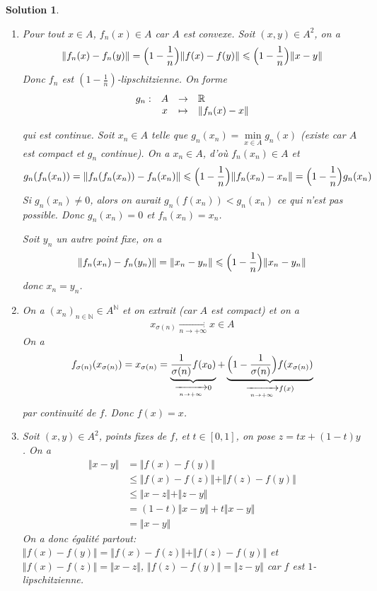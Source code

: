 \documentclass[12pt]{article}
\newtheorem{solution}{Solution}[section]
\theoremstyle{remark}
\newcommand{\N}{\mathbb{N}} \newcommand{\Z}{\mathbb{Z}}
\newcommand{\function}[5]{
	$$
	\begin{array}{rccl}
		#1: & #2 & \to & #3 \\
		& #4 & \mapsto & #5
	\end{array}
	$$
}
\begin{document}
\begin{solution}
	\phantom{}
	\begin{enumerate}
		\item Pour tout $x\in A$, $f_{n}(x)\in A$ car $A$ est convexe. Soit $(x,y)\in A^{2}$, on a
		$$\Vert f_{n}(x)-f_{n}(y)\Vert=\Bigl(1-\frac{1}{n}\Bigr)\Vert f(x)-f(y)\Vert\leqslant\Bigl(1-\frac{1}{n}\Bigr)\Vert x-y\Vert$$
		Donc $f_{n}$ est $(1-\frac{1}{n})$-lipschitzienne. On forme \function{g_n}{A}{\R}{x}{\Vert f_n(x)-x\Vert}
		qui est continue. Soit $x_{n}\in A$ telle que $g_{n}(x_{n})=\min\limits_{x\in A}g_{n}(x)$ (existe car $A$ est compact et $g_{n}$ continue). On a $x_{n}\in A$, d'où $f_{n}(x_{n})\in A$ et 
		$$g_{n}(f_{n}(x_{n}))=\Vert f_{n}(f_{n}(x_{n}))-f_{n}(x_{n})\Vert\leqslant\Bigl(1-\frac{1}{n}\Bigr)\Vert f_{n}(x_{n})-x_{n}\Vert=\Bigl(1-\frac{1}{n}\Bigr)g_{n}(x_{n})$$
		Si $g_{n}(x_{n})\neq0$, alors on aurait $g_{n}(f(x_{n}))<g_{n}(x_{n})$ ce qui n'est pas possible. Donc $g_{n}(x_{n})=0$ et $f_{n}(x_{n})=x_{n}$.

		Soit $y_{n}$ un autre point fixe, on a 
		$$\Vert f_{n}(x_{n})-f_{n}(y_{n})\Vert=\Vert x_{n}-y_{n}\Vert\leqslant\Bigl(1-\frac{1}{n}\Bigr)\Vert x_{n}-y_{n}\Vert$$
		donc $x_{n}=y_{n}$.

		\item On a $(x_{n})_{n\in\N}\in A^{\N}$ et on extrait (car $A$ est compact) et on a 
		$$x_{\sigma(n)}\xrightarrow[n\to+\infty]{}x\in A$$
		On a 
		$$f_{\sigma(n)}(x_{\sigma(n)})=x_{\sigma(n)}=\underbrace{\frac{1}{\sigma(n)}f(x_{0})}_{\xrightarrow[n\to+\infty]{}0}+\underbrace{\Bigl(1-\frac{1}{\sigma(n)}\Bigr)f(x_{\sigma(n)})}_{\xrightarrow[n\to+\infty]{}f(x)}$$
		par continuité de $f$. Donc $f(x)=x$.

		\item Soit $(x,y)\in A^{2}$, points fixes de $f$, et $t\in[0,1]$, on pose $z=tx+(1-t)y$. On a 
		\begin{align*}
			\Vert x-y\Vert
			&=\Vert f(x)-f(y)\Vert\\
			&\leqslant \Vert f(x)-f(z)\Vert+\Vert f(z)-f(y)\Vert\\
			&\leqslant\Vert x-z\Vert+\Vert z-y\Vert\\
			&=(1-t)\Vert x-y\Vert+t\Vert x-y\Vert\\
			&=\Vert x-y\Vert
		\end{align*}
		On a donc égalité partout: $\Vert f(x)-f(y)\Vert=\Vert f(x)-f(z)\Vert+\Vert f(z)-f(y)\Vert$ et $\Vert f(x)-f(z)\Vert=\Vert x-z\Vert$, $\Vert f(z)-f(y)\Vert=\Vert z-y\Vert$ car $f$ est $1$-lipschitzienne.


\end{enumerate}
\end{solution}
\end{document}
